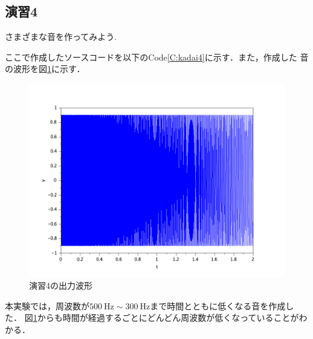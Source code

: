 \documentclass[a4paper,11pt]{jsarticle}
\begin{document}
  \subsection{演習4}
    \begin{screen}
      さまざまな音を作ってみよう.
    \end{screen}
    ここで作成したソースコードを以下のCode\ref{C:kadai4}に示す．また，作成した
    音の波形を図\ref{G:kadai4}に示す．
    
    \begin{figure}[H]
      \centering
      \includegraphics[width=0.8\linewidth]{picture/kadai4.png}
      \caption{演習4の出力波形}
      \label{G:kadai4}
    \end{figure}
    本実験では，周波数が$\SI{500}{\hertz} \sim \SI{300}{\hertz}$まで時間とともに低くなる音を作成した．
    図\ref{G:kadai4}からも時間が経過するごとにどんどん周波数が低くなっていることがわかる．
\end{document}
